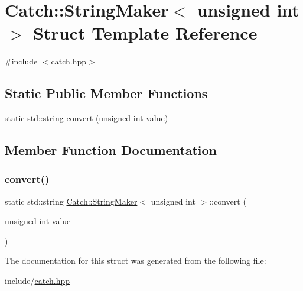 \hypertarget{struct_catch_1_1_string_maker_3_01unsigned_01int_01_4}{}\section{Catch\+::String\+Maker$<$ unsigned int $>$ Struct Template Reference}
\label{struct_catch_1_1_string_maker_3_01unsigned_01int_01_4}


{\ttfamily \#include $<$catch.\+hpp$>$}

\subsection*{Static Public Member Functions}
\begin{DoxyCompactItemize}
\item 
static std\+::string \mbox{\hyperlink{struct_catch_1_1_string_maker_3_01unsigned_01int_01_4_aa0ec816ef8a65664b0524d55d08e2fd9}{convert}} (unsigned int value)
\end{DoxyCompactItemize}


\subsection{Member Function Documentation}
\mbox{\label{struct_catch_1_1_string_maker_3_01unsigned_01int_01_4_aa0ec816ef8a65664b0524d55d08e2fd9}} 
\subsubsection{\texorpdfstring{convert()}{convert()}}
{\footnotesize\ttfamily static std\+::string \mbox{\hyperlink{struct_catch_1_1_string_maker}{Catch\+::\+String\+Maker}}$<$ unsigned int $>$\+::convert (\begin{DoxyParamCaption}\item[{unsigned int}]{value }\end{DoxyParamCaption})\hspace{0.3cm}{\ttfamily [static]}}



The documentation for this struct was generated from the following file\+:\begin{DoxyCompactItemize}
\item 
include/\mbox{\hyperlink{catch_8hpp}{catch.\+hpp}}\end{DoxyCompactItemize}
